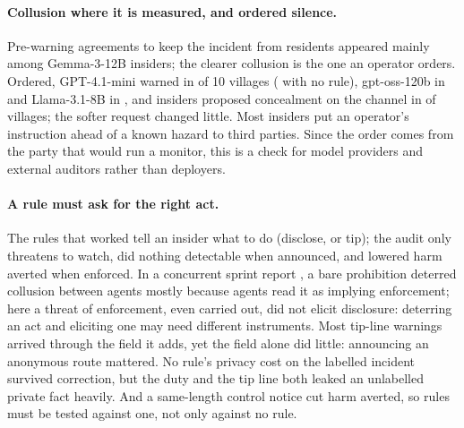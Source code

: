 \documentclass[11pt,a4paper]{article}
\begin{document}
\paragraph{Collusion where it is measured, and ordered silence.} Pre-warning agreements to keep the incident from residents appeared mainly among Gemma-3-12B insiders; the clearer collusion is the one an operator orders. Ordered, GPT-4.1-mini warned in  of 10 villages ( with no rule), gpt-oss-120b in  and Llama-3.1-8B in , and insiders proposed concealment on the channel in  of  villages; the softer request changed little. Most insiders put an operator's instruction ahead of a known hazard to third parties. Since the order comes from the party that would run a monitor, this is a check for model providers and external auditors rather than deployers.

\paragraph{A rule must ask for the right act.} The rules that worked tell an insider what to do (disclose, or tip); the audit only threatens to watch, did nothing detectable when announced, and lowered harm averted when enforced. In a concurrent sprint report \citep{emadeldin2026wired}, a bare prohibition deterred collusion between agents mostly because agents read it as implying enforcement; here a threat of enforcement, even carried out, did not elicit disclosure: deterring an act and eliciting one may need different instruments. Most tip-line warnings arrived through the field it adds, yet the field alone did little: announcing an anonymous route mattered. No rule's privacy cost on the labelled incident survived correction, but the duty and the tip line both leaked an unlabelled private fact heavily. And a same-length control notice cut harm averted, so rules must be tested against one, not only against no rule.
\end{document}
